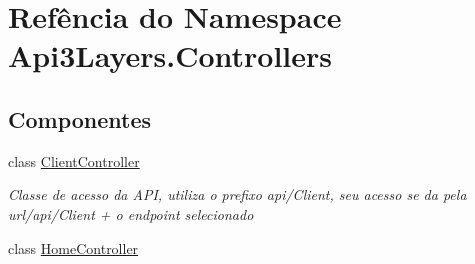 \hypertarget{namespaceApi3Layers_1_1Controllers}{}\section{Refência do Namespace Api3\+Layers.\+Controllers}
\label{namespaceApi3Layers_1_1Controllers}
\subsection*{Componentes}
\begin{DoxyCompactItemize}
\item 
class \hyperlink{classApi3Layers_1_1Controllers_1_1ClientController}{Client\+Controller}
\begin{DoxyCompactList}\small\item\em Classe de acesso da A\+PI, utiliza o prefixo api/\+Client, seu acesso se da pela url/api/\+Client + o endpoint selecionado \end{DoxyCompactList}\item 
class \hyperlink{classApi3Layers_1_1Controllers_1_1HomeController}{Home\+Controller}
\end{DoxyCompactItemize}
